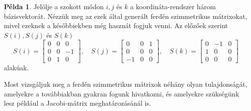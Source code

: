 \documentclass[12pt,a4paper]{report}
\theoremstyle{remark}
\theoremstyle{definition}
\newtheorem{pl}{Példa}[section]
\begin{document}
\begin{pl}
Jelölje a szokott módon $i, j$ és $k$ a koordináta-rendszer három bázisvektorát. Nézzük meg az ezek által generált 
ferdén szimmetrikus mátrixokat, mivel ezeknek a későbbiekben még hasznát fogjuk venni. Az előzőek szerint 
$S(i), S(j)$ és $S(k)$
\begin{equation}
S(i) = \begin{bmatrix}
    0 & 0 & 0 \\ 
    0 & 0 & -1 \\ 
    0 & 1 & 0
    \end{bmatrix}, \quad
S(j) = \begin{bmatrix}
    0 & 0 & 1 \\ 
    0 & 0 & 0 \\ 
    -1 & 0 & 0
    \end{bmatrix}, \quad
S(k) = \begin{bmatrix}
    0 & -1 & 0 \\ 
    1 & 0 & 0 \\ 
    0 & 0 & 0
    \end{bmatrix} 
\end{equation}
alakúak.
\end{pl}

Most vizsgáljuk meg a ferdén szimmetrikus mátrixok néhány olyan tulajdonságát, amelyekre a továbbiakban gyakran 
fogunk hivatkozni, és amelyekre szükségünk lesz például a Jacobi-mátrix meghatározásánál is.
\end{document}
